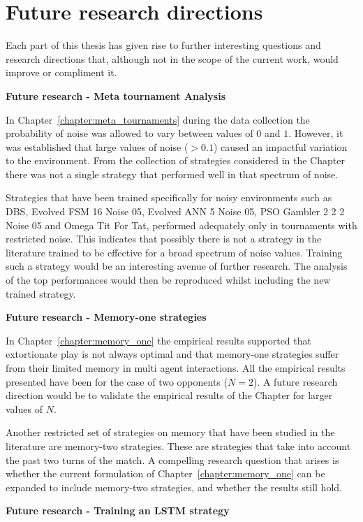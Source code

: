 \section{Future research directions}

Each part of this thesis has given rise to further interesting questions and
research directions that, although not in the scope of the current work, would
improve or compliment it.

\textbf{Future research - Meta tournament Analysis}

In Chapter~\ref{chapter:meta_tournaments} during the data collection the
probability of noise was allowed to vary between values of \(0\) and \(1\).
However, it was established that large values of noise (\(>
0.1\)) caused an impactful variation to the environment. From the collection of
\numberofstrategies strategies considered in the Chapter there was not a single
strategy that performed well in that spectrum of noise.

Strategies that have been trained specifically for noisy environments such
as DBS, Evolved FSM 16 Noise 05, Evolved ANN 5 Noise 05, PSO Gambler 2 2 2 Noise 05
and Omega Tit For Tat, performed adequately only in tournaments with restricted
noise. This indicates that possibly there is not a strategy in the literature
trained to be effective for a broad spectrum of noise values. Training such
a strategy would be an interesting avenue of further research. The analysis of the
top performances would then be reproduced whilst including the new trained strategy.

\textbf{Future research - Memory-one strategies}

In Chapter~\ref{chapter:memory_one} the empirical results supported that
extortionate play is not always optimal and that memory-one strategies suffer
from their limited memory in multi agent interactions. All the empirical results
presented have been for the case of two opponents (\(N=2\)). A
future research direction would be to validate the empirical results of the Chapter for
larger values of \(N\).

Another restricted set of strategies on memory that have been studied in the literature
are memory-two strategies. These are strategies that take into account the past
two turns of the match. A compelling research question that arises is whether
the current formulation of Chapter~\ref{chapter:memory_one} can be expanded to
include memory-two strategies, and whether the results still hold.

\textbf{Future research - Training an LSTM strategy}

